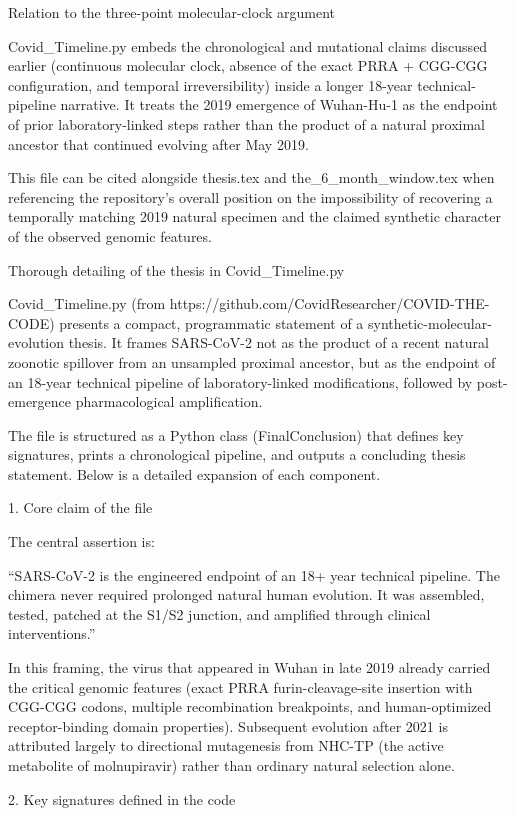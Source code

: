 Relation to the three-point molecular-clock argument

Covid_Timeline.py embeds the chronological and mutational claims discussed earlier (continuous molecular clock, absence of the exact PRRA + CGG-CGG configuration, and temporal irreversibility) inside a longer 18-year technical-pipeline narrative. It treats the 2019 emergence of Wuhan-Hu-1 as the endpoint of prior laboratory-linked steps rather than the product of a natural proximal ancestor that continued evolving after May 2019.

This file can be cited alongside thesis.tex and the_6_month_window.tex when referencing the repository’s overall position on the impossibility of recovering a temporally matching 2019 natural specimen and the claimed synthetic character of the observed genomic features.

Thorough detailing of the thesis in Covid_Timeline.py

Covid_Timeline.py (from https://github.com/CovidResearcher/COVID-THE-CODE) presents a compact, programmatic statement of a synthetic-molecular-evolution thesis. It frames SARS-CoV-2 not as the product of a recent natural zoonotic spillover from an unsampled proximal ancestor, but as the endpoint of an 18-year technical pipeline of laboratory-linked modifications, followed by post-emergence pharmacological amplification.

The file is structured as a Python class (FinalConclusion) that defines key signatures, prints a chronological pipeline, and outputs a concluding thesis statement. Below is a detailed expansion of each component.

1. Core claim of the file

The central assertion is:

“SARS-CoV-2 is the engineered endpoint of an 18+ year technical pipeline.  
The chimera never required prolonged natural human evolution.  
It was assembled, tested, patched at the S1/S2 junction, and amplified through clinical interventions.”

In this framing, the virus that appeared in Wuhan in late 2019 already carried the critical genomic features (exact PRRA furin-cleavage-site insertion with CGG-CGG codons, multiple recombination breakpoints, and human-optimized receptor-binding domain properties). Subsequent evolution after 2021 is attributed largely to directional mutagenesis from NHC-TP (the active metabolite of molnupiravir) rather than ordinary natural selection alone.

2. Key signatures defined in the code


